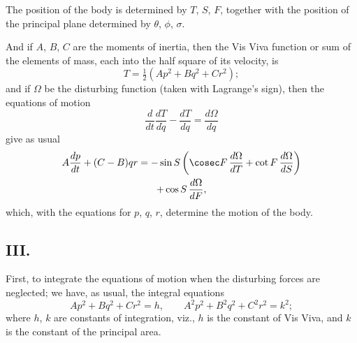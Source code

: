 \documentclass[11pt,a4paper]{book}
\begin{document}
{{The position of the body is determined by $T$, $S$, $F$, together with the position of the principal plane determined by $\theta$, $\phi$, $\sigma$.

And if $A$, $B$, $C$ are the moments of inertia, then the Vis Viva function or sum of the elements of mass, each into the half square of its velocity, is
\[
T = \tfrac{1}{2}(Ap^2 + Bq^2 + Cr^2);
\]
and if $\Omega$ be the disturbing function (taken with Lagrange's sign), then the equations of motion
\[
\frac{d}{dt}\frac{dT}{d\dot{q}} - \frac{dT}{dq} = \frac{d\Omega}{dq}
\]
give as usual
\begin{multline}
A\frac{dp}{dt} + (C-B)qr = -\sin S\left(\cosec F\,\frac{d\Omega}{dT} + \cot F\,\frac{d\Omega}{dS}\right) \notag\\
+ \cos S\,\frac{d\Omega}{dF},
\end{multline}
which, with the equations for $p$, $q$, $r$, determine the motion of the body.

\subsection*{III.}

First, to integrate the equations of motion when the disturbing forces are neglected; we have, as usual, the integral equations
\[
Ap^2 + Bq^2 + Cr^2 = h, \qquad A^2p^2 + B^2q^2 + C^2r^2 = k^2;
\]
where $h$, $k$ are constants of integration, viz., $h$ is the constant of Vis Viva, and $k$ is the constant of the principal area.

}}
\end{document}
